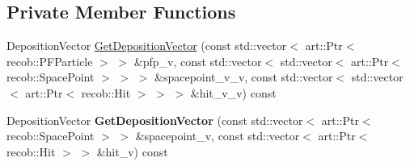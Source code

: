 \subsection*{Private Member Functions}
\begin{DoxyCompactItemize}
\item 
Deposition\+Vector \hyperlink{classflashmatch_1_1FlashMatchingTool_1_1SliceCandidate_a86c84dbe03676ae04a64a45e7c449b0e}{Get\+Deposition\+Vector} (const std\+::vector$<$ art\+::\+Ptr$<$ recob\+::\+P\+F\+Particle $>$ $>$ \&pfp\+\_\+v, const std\+::vector$<$ std\+::vector$<$ art\+::\+Ptr$<$ recob\+::\+Space\+Point $>$ $>$ $>$ \&spacepoint\+\_\+v\+\_\+v, const std\+::vector$<$ std\+::vector$<$ art\+::\+Ptr$<$ recob\+::\+Hit $>$ $>$ $>$ \&hit\+\_\+v\+\_\+v) const 
\item 
Deposition\+Vector {\bfseries Get\+Deposition\+Vector} (const std\+::vector$<$ art\+::\+Ptr$<$ recob\+::\+Space\+Point $>$ $>$ \&spacepoint\+\_\+v, const std\+::vector$<$ art\+::\+Ptr$<$ recob\+::\+Hit $>$ $>$ \&hit\+\_\+v) const \hypertarget{classflashmatch_1_1FlashMatchingTool_1_1SliceCandidate_aae12341bbdb7d9f2120f0fd25a227f24}{}\label{classflashmatch_1_1FlashMatchingTool_1_1SliceCandidate_aae12341bbdb7d9f2120f0fd25a227f24}


\end{DoxyCompactItemize}
